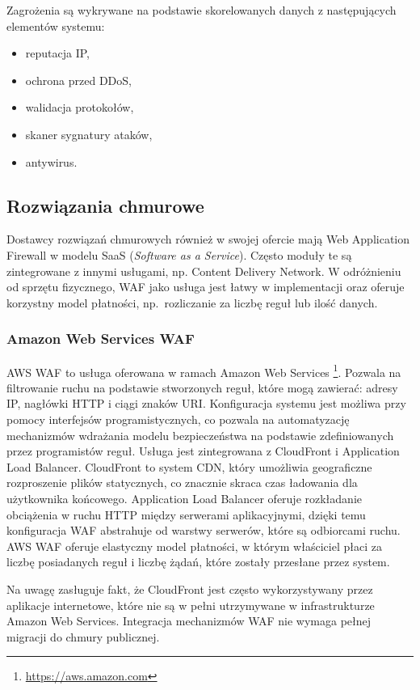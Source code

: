 \documentclass[11pt,a4paper,polish,thesis]{dcsbook}
\begin{document}
Zagrożenia są wykrywane na podstawie skorelowanych danych z następujących elementów systemu:
\begin{itemize}
\item reputacja IP,
\item ochrona przed DDoS,
\item walidacja protokołów,
\item skaner sygnatury ataków,
\item antywirus.
\end{itemize}

\subsection{Rozwiązania chmurowe}
Dostawcy rozwiązań chmurowych również w swojej ofercie mają Web Application Firewall w modelu SaaS (\textit{Software as a Service}). Często moduły te są zintegrowane z innymi usługami, np. Content Delivery Network. W odróżnieniu od sprzętu fizycznego, WAF jako usługa jest łatwy w implementacji oraz oferuje korzystny model płatności, np.~rozliczanie za liczbę reguł lub ilość danych.
\subsubsection{Amazon Web Services WAF}
AWS WAF to usługa oferowana w ramach Amazon Web Services \footnote{\url{https://aws.amazon.com}}. Pozwala na filtrowanie ruchu na podstawie stworzonych reguł, które mogą zawierać: adresy IP, nagłówki HTTP i ciągi znaków URI. Konfiguracja systemu jest możliwa przy pomocy interfejsów programistycznych, co pozwala na automatyzację mechanizmów wdrażania modelu bezpieczeństwa na podstawie zdefiniowanych przez programistów reguł. Usługa jest zintegrowana z CloudFront i Application Load Balancer. CloudFront to system CDN, który umożliwia geograficzne rozproszenie plików statycznych, co znacznie skraca czas ładowania dla użytkownika końcowego. Application Load Balancer oferuje rozkładanie obciążenia w ruchu HTTP między serwerami aplikacyjnymi, dzięki temu konfiguracja WAF abstrahuje od warstwy serwerów, które są odbiorcami ruchu. AWS WAF oferuje elastyczny model płatności, w którym właściciel płaci za liczbę posiadanych reguł i liczbę żądań, które zostały przesłane przez system.

Na uwagę zasługuje fakt, że CloudFront jest często wykorzystywany przez aplikacje internetowe, które nie są w pełni utrzymywane w infrastrukturze Amazon Web Services. Integracja mechanizmów WAF nie wymaga pełnej migracji do chmury publicznej.
\end{document}
